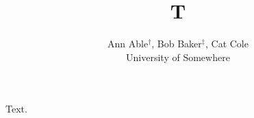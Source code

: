 \documentclass{article}
\begin{document}
\title{T}
\author{Ann Able$^{\dag}$, Bob Baker$^{\ddag}$, Cat Cole\\ University of Somewhere}
\maketitle
Text.
\end{document}
